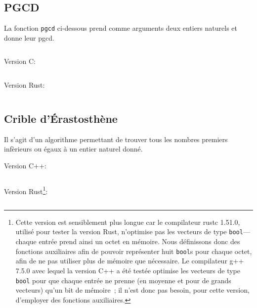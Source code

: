 \subsection{PGCD}
\label{app:Haskell_pgcd}

\noindent 
La fonction \texttt{pgcd} ci-dessous prend comme arguments deux entiers naturels et donne leur pgcd.

\vspace*{1ex}

\noindent
{}
\vspace*{-1ex}
\inputminted{Haskell}{Ensembles_Arithmétique/Code/pgcd.hs}

\medskip

\noindent Version C: 
\inputminted{C}{Ensembles_Arithmétique/Code/pgcd.c}

\medskip

\noindent Version Rust: 
\inputminted{Rust}{Ensembles_Arithmétique/Code/pgcd.rs}

\subsection{Crible d'Érastosthène}
\label{app:code_erastosthene}

Il s'agit d'un algorithme permettant de trouver tous les nombres premiers infèrieurs ou égaux à un entier naturel donné.

\bigskip

\noindent Version C++: 
\inputminted{C++}{Ensembles_Arithmétique/Code/Érastosthène.cpp}

\bigskip

\noindent Version Rust\footnote{
    Cette version est sensiblement plus longue car le compilateur rustc 1.51.0, utilisé pour tester la version Rust, n'optimise pas les vecteurs de type \texttt{bool}—chaque entrée prend ainsi un octet en mémoire. 
    Nous définissons donc des fonctions auxiliaires afin de pouvoir représenter huit \texttt{bool}s pour chaque octet, afin de ne pas utiliser plus de mémoire que nécessaire.
    Le compilateur g++ 7.5.0 avec lequel la version C++ a été testée optimise les vecteurs de type \texttt{bool} pour que chaque entrée ne prenne (en moyenne et pour de grands vecteurs) qu'un bit de mémoire ; il n'est donc pas besoin, pour cette version, d'employer des fonctions auxiliaires. 
}: 
\inputminted{Rust}{Ensembles_Arithmétique/Code/Érastosthène.rs}
